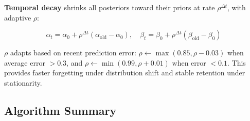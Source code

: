 \documentclass[letterpaper]{article}
\begin{document}
\textbf{Temporal decay} shrinks all posteriors toward their priors at rate $\rho^{\Delta t}$, with adaptive $\rho$:

\begin{equation}
\alpha_t = \alpha_0 + \rho^{\Delta t}(\alpha_{\text{old}} - \alpha_0), \quad \beta_t = \beta_0 + \rho^{\Delta t}(\beta_{\text{old}} - \beta_0)
\end{equation}

$\rho$ adapts based on recent prediction error: $\rho \leftarrow \max(0.85, \rho - 0.03)$ when average error $> 0.3$, and $\rho \leftarrow \min(0.99, \rho + 0.01)$ when error $< 0.1$. This provides faster forgetting under distribution shift and stable retention under stationarity.

\subsection{Algorithm Summary}
\end{document}
